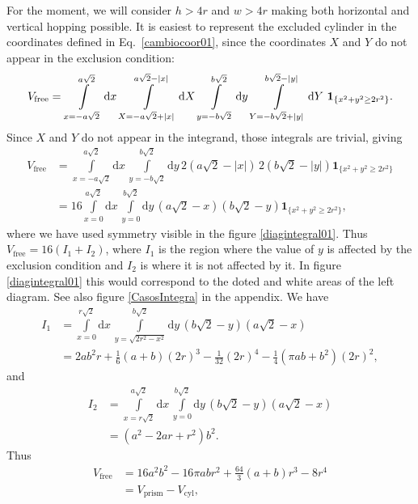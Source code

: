 \documentclass[superscriptaddress,pre,reprint,showpacs,onecolumn]{revtex4-1}
\newcommand{\rd}[1]{\mathrm{d}{#1} \,}
\newcommand{\indicatorsymbol}{\mathbf{1}}
\newcommand{\indicator}[1]{\indicatorsymbol_{ \{   #1 \} } }
\begin{document}
For the moment, we will consider $h > 4r$ and $w > 4r$ making both horizontal and vertical hopping possible.
It is easiest to represent the  
excluded cylinder in the coordinates defined in 
Eq.~\ref{cambiocoor01}, since the coordinates $X$ and $Y$ 
do not appear in the exclusion condition:
\begin{equation}\label{integraltotal}
 V_\text{free} = \\ \int\limits_{x=-a \sqrt{2}}^{a \sqrt{2}} \rd x 
\int\limits_{X=-a \sqrt{2} + |x| }^{a \sqrt{2} - |x|}  \rd X
 \int\limits_{y=-b \sqrt{2}}^{b \sqrt{2}} \rd y
\int\limits_{Y=-b \sqrt{2} + |y| }^{b \sqrt{2}-|y|}  \rd Y
\, \indicator{ x^2 + y^2 \ge 2r^2  }.
\end{equation}
Since $X$ and $Y$ do not appear in the integrand, those integrals are trivial, giving
\begin{align}
 V_\text{free}  &= \int\limits_{x=-a \sqrt{2}}^{a \sqrt{2}} \rd x  \int\limits_{y=-b \sqrt{2}}^{b \sqrt{2}} \rd y
2 \left( a \sqrt{2} - |x| \right) \, 2 \left( b \sqrt{2} - |y| \right) \indicator{ x^2 + y^2 \ge 2r^2 } \\
 &= 16 \int\limits_{x=0}^{a \sqrt{2}} \rd x  \int\limits_{y=0}^{b \sqrt{2}} \rd y 
\left( a \sqrt{2} - x \right) \left( b \sqrt{2} - y \right) \indicator{ x^2 + y^2 \ge 2r^2 },
\end{align}
where we have used symmetry visible in the figure \ref{diagintegral01}.
Thus $V_\text{free} = 16(I_1 + I_2)$, where $I_1$ is the region where the value of $y$
is affected by the exclusion condition and $I_2$ is where it is not affected
by it.  In figure \ref{diagintegral01} this would correspond to the doted and
white areas of the left diagram. See also figure \ref{CasosIntegra} in the appendix. 
We have
\begin{align}
 I_1 &= \int\limits_{x=0}^{r\sqrt{2}} \rd x \int\limits_{y = \sqrt{ 2r^2 - x^2}}^{b \sqrt{2}} \rd y
\left( b \sqrt{2} - y \right)  \left( a \sqrt{2} - x \right) \\
&= 	
2 a b^{2} r  + \textstyle \frac{1}{6} (a+b) (2r)^{3} - \frac{1}{32}  (2r)^{4} - \frac{1}{4} {\left(\pi a b + b^{2}\right)} (2r)^2,
\end{align}
and
\begin{align}
 I_2 &= \int\limits_{x=r  \sqrt{2}}^{a \sqrt{2}} \rd x  \int\limits_{y = 0}^{b \sqrt{2}} \rd y
 \left( b \sqrt{2} - y \right)  \left( a \sqrt{2} - x \right)  \\
&=	
{\left( a^{2} - 2ar +   r^{2}\right)} b^{2}.
\end{align}
Thus 
\begin{align}\label{volumeabd}
 V_\text{free}
 & =  16 a^{2} b^{2}  - 16 \pi a b r^{2} + \textstyle \frac{64}{3} (a+b) r^{3}  - 8 r^{4} \\
&= V_\text{prism} - V_\text{cyl},
\end{align}
\end{document}
